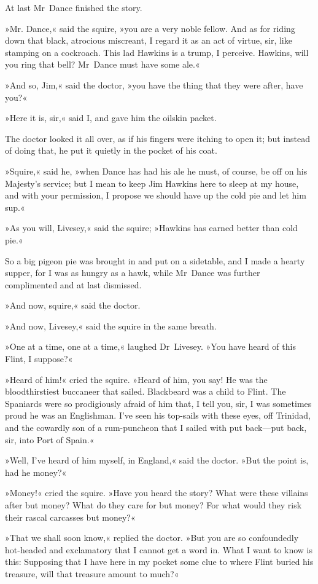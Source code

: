 At last Mr~Dance finished the story.

»Mr. Dance,« said the squire, »you are a very noble fellow. And as for riding down that black, atrocious miscreant, I regard it as an act of virtue, sir, like stamping on a cockroach. This lad Hawkins is a trump, I perceive. Hawkins, will you ring that bell? Mr~Dance must have some ale.«

»And so, Jim,« said the doctor, »you have the thing that they were after, have you?«

»Here it is, sir,« said I, and gave him the oilskin packet.

The doctor looked it all over, as if his fingers were itching to open it; but instead of doing that, he put it quietly in the pocket of his coat.

»Squire,« said he, »when Dance has had his ale he must, of course, be off on his Majesty's service; but I mean to keep Jim Hawkins here to sleep at my house, and with your permission, I propose we should have up the cold pie and let him sup.«

»As you will, Livesey,« said the squire; »Hawkins has earned better than cold pie.«

So a big pigeon pie was brought in and put on a sidetable, and I made a hearty supper, for I was as hungry as a hawk, while Mr~Dance was further complimented and at last dismissed.

»And now, squire,« said the doctor.

»And now, Livesey,« said the squire in the same breath.

»One at a time, one at a time,« laughed Dr~Livesey. »You have heard of this Flint, I suppose?«

»Heard of him!« cried the squire. »Heard of him, you say! He was the bloodthirstiest buccaneer that sailed. Blackbeard was a child to Flint. The Spaniards were so prodigiously afraid of him that, I tell you, sir, I was sometimes proud he was an Englishman. I've seen his top-sails with these eyes, off Trinidad, and the cowardly son of a rum-puncheon that I sailed with put back—put back, sir, into Port of Spain.«

»Well, I've heard of him myself, in England,« said the doctor. »But the point is, had he money?«

»Money!« cried the squire. »Have you heard the story? What were these villains after but money? What do they care for but money? For what would they risk their rascal carcasses but money?«

»That we shall soon know,« replied the doctor. »But you are so confoundedly hot-headed and exclamatory that I cannot get a word in. What I want to know is this: Supposing that I have here in my pocket some clue to where Flint buried his treasure, will that treasure amount to much?«

